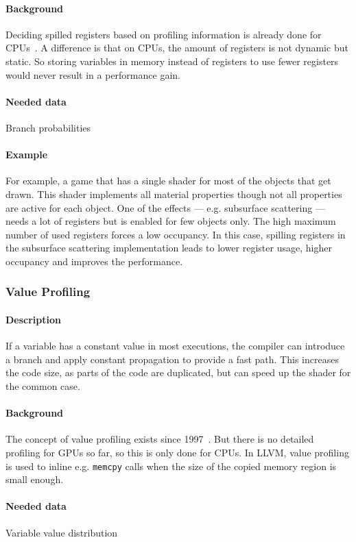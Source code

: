\paragraph{Background} Deciding spilled registers based on profiling information is already done for CPUs~\cite{Bakhvalov2019}. A difference is that on CPUs, the amount of registers is not dynamic but static. So storing variables in memory instead of registers to use fewer registers would never result in a performance gain.
\paragraph{Needed data} Branch probabilities
\paragraph{Example} For example, a game that has a single shader for most of the objects that get drawn. This shader implements all material properties though not all properties are active for each object.
One of the effects --- e.g. subsurface scattering --- needs a lot of registers but is enabled for few objects only. The high maximum number of used registers forces a low occupancy.
In this case, spilling registers in the subsurface scattering implementation leads to lower register usage, higher occupancy and improves the performance.

\subsubsection{Value Profiling}
\paragraph{Description} If a variable has a constant value in most executions, the compiler can introduce a branch and apply constant propagation to provide a fast path. This increases the code size, as parts of the code are duplicated, but can speed up the shader for the common case.
\paragraph{Background} The concept of value profiling exists since 1997~\cite{Calder1997}. But there is no detailed profiling for GPUs so far, so this is only done for CPUs. In LLVM, value profiling is used to inline e.g. \texttt{memcpy} calls when the size of the copied memory region is small enough.
\paragraph{Needed data} Variable value distribution
